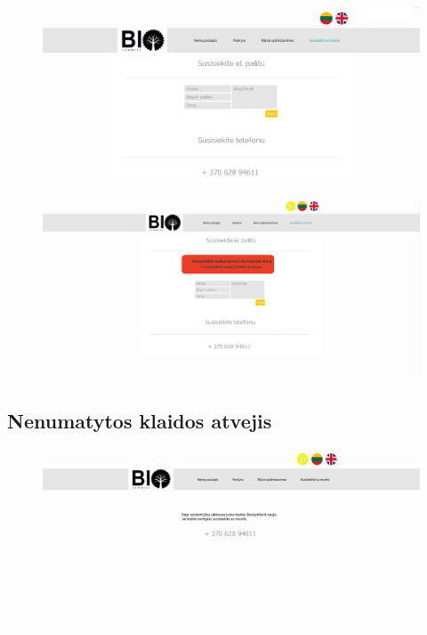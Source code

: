 \documentclass[a4paper,12pt]{article}
\begin{document}
\begin{figure}[!tph]
\hspace{-2cm}
\centering
\includegraphics[scale=0.45]{interfeisai/susisiekimas}
\label{fig:verticalcell}
\end{figure}

\begin{figure}[!tph]
\hspace{-2cm}
\includegraphics[scale=0.45]{interfeisai/susisiekimasSuKlaida}
\label{fig:verticalcell}
\end{figure}

\subsection{ Nenumatytos klaidos atvejis}
\begin{figure}[!tph]
\hspace{-2cm}
\centering
\includegraphics[scale=0.45]{interfeisai/bendraKlaida}
\label{fig:verticalcell}
\end{figure}
\end{document}
